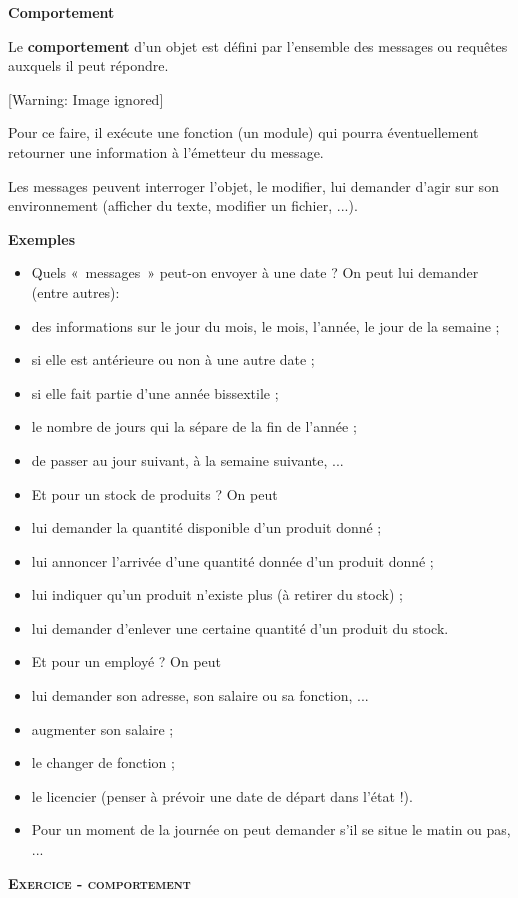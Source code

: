 \bigskip

{\sffamily\bfseries\upshape
Comportement}

{
Le \textbf{comportement} d'un objet est défini par
l'ensemble des messages ou requêtes auxquels il peut
répondre.}

\begin{center}
 [Warning: Image ignored] %

\end{center}
{
Pour ce faire, il exécute une fonction (un module) qui pourra
éventuellement retourner une information à l'émetteur
du message.}

{
Les messages peuvent interroger l'objet, le modifier,
lui demander d'agir sur son environnement (afficher du
texte, modifier un fichier, ...). }

{
\textbf{Exemples} }

\liststyleListv
\begin{itemize}
\item {
Quels «~messages~» peut-on envoyer à une date ? On peut lui demander
(entre autres):}
\item {
des informations sur le jour du mois, le mois, l'année,
le jour de la semaine ; }
\item {
si elle est antérieure ou non à une autre date ;}
\item {
si elle fait partie d'une année bissextile ; }
\item {
le nombre de jours qui la sépare de la fin de l'année
;}
\item {
de passer au jour suivant, à la semaine suivante, ...}
\item {
Et pour un stock de produits ? On peut }
\item {
lui demander la quantité disponible d'un produit donné
;}
\item {
lui annoncer l'arrivée d'une quantité
donnée d'un produit donné ;}
\item {
lui indiquer qu'un produit n'existe
plus (à retirer du stock) ;}
\item {
lui demander d'enlever une certaine quantité
d'un produit du stock.}
\item {
Et pour un employé ? On peut}
\item {
lui demander son adresse, son salaire ou sa fonction, ...}
\item {
augmenter son salaire ;}
\item {
le changer de fonction ;}
\item {
le licencier (penser à prévoir une date de départ dans
l'état !).}
\item {
Pour un moment de la journée on peut demander s'il se
situe le matin ou pas, ...}
\end{itemize}
{\sffamily\bfseries\scshape
Exercice - comportement}

